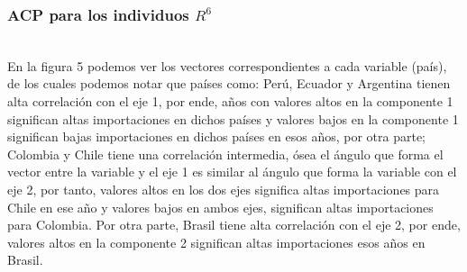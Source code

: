 \documentclass[12pt]{beamer}
\begin{document}
\begin{frame}
\frametitle{ACP para los individuos $R^6$}
~\\En la figura 5 podemos ver los vectores correspondientes a cada variable (país), de los cuales podemos notar que países como: Perú, Ecuador y Argentina tienen alta correlación con el eje 1, por ende, años con valores altos en la componente 1 significan altas importaciones en dichos países y valores bajos en la componente 1 significan bajas importaciones en dichos países en esos años, por otra parte; Colombia y Chile tiene una correlación intermedia, ósea el ángulo que forma el vector entre la variable y el eje 1 es similar al ángulo que forma la variable con el eje 2, por tanto, valores altos en los dos ejes significa altas importaciones para Chile en ese año y valores bajos en ambos ejes, significan altas importaciones para Colombia. Por otra parte, Brasil tiene alta correlación con el eje 2, por ende, valores altos en la componente 2 significan altas importaciones esos años en Brasil.
\end{frame}
\end{document}

